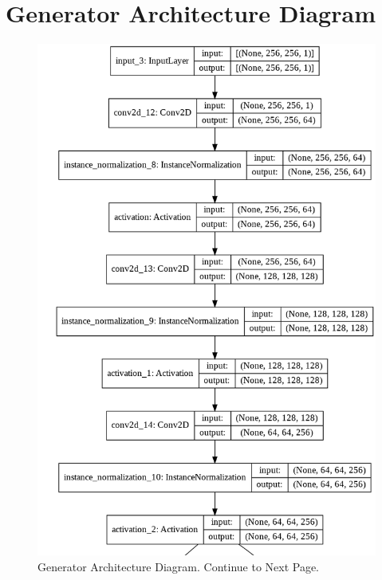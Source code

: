 \section{Generator Architecture Diagram}
\vspace*{2.2cm}
\begin{figure}[H]
	    \begin{center} 
	    \includegraphics[scale=0.60]{images/generator_1.png}
	     \caption{Generator Architecture Diagram. Continue to Next Page.}
	     \label{fig:generator}
	    \end{center}
\end{figure}


